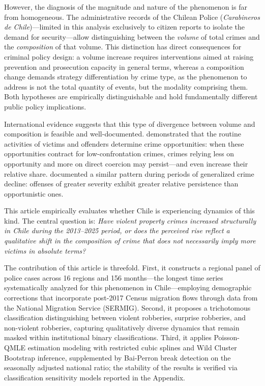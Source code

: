 \documentclass[pdflatex,sn-basic]{sn-jnl}
\begin{document}
However, the diagnosis of the magnitude and nature of the phenomenon is far from homogeneous. The administrative records of the Chilean Police (\textit{Carabineros de Chile})---limited in this analysis exclusively to citizen reports to isolate the demand for security---allow distinguishing between the \emph{volume} of total crimes and the \emph{composition} of that volume. This distinction has direct consequences for criminal policy design: a volume increase requires interventions aimed at raising prevention and prosecution capacity in general terms, whereas a composition change demands strategy differentiation by crime type, as the phenomenon to address is not the total quantity of events, but the modality comprising them. Both hypotheses are empirically distinguishable and hold fundamentally different public policy implications.

International evidence suggests that this type of divergence between volume and composition is feasible and well-documented. \citet{cohen1979} demonstrated that the routine activities of victims and offenders determine crime opportunities: when these opportunities contract for low-confrontation crimes, crimes relying less on opportunity and more on direct coercion may persist---and even increase their relative share. \citet{blumstein1988} documented a similar pattern during periods of generalized crime decline: offenses of greater severity exhibit greater relative persistence than opportunistic ones.

This article empirically evaluates whether Chile is experiencing dynamics of this kind. The central question is: \textit{Have violent property crimes increased structurally in Chile during the 2013--2025 period, or does the perceived rise reflect a qualitative shift in the composition of crime that does not necessarily imply more victims in absolute terms?}

The contribution of this article is threefold. First, it constructs a regional panel of police cases across 16 regions and 156 months---the longest time series systematically analyzed for this phenomenon in Chile---employing demographic corrections that incorporate post-2017 Census migration flows through data from the National Migration Service (SERMIG). Second, it proposes a trichotomous classification distinguishing between violent robberies, surprise robberies, and non-violent robberies, capturing qualitatively diverse dynamics that remain masked within institutional binary classifications. Third, it applies Poisson-QMLE estimation modeling with restricted cubic splines and Wild Cluster Bootstrap inference, supplemented by Bai-Perron break detection on the seasonally adjusted national ratio; the stability of the results is verified via classification sensitivity models reported in the Appendix.
\end{document}
